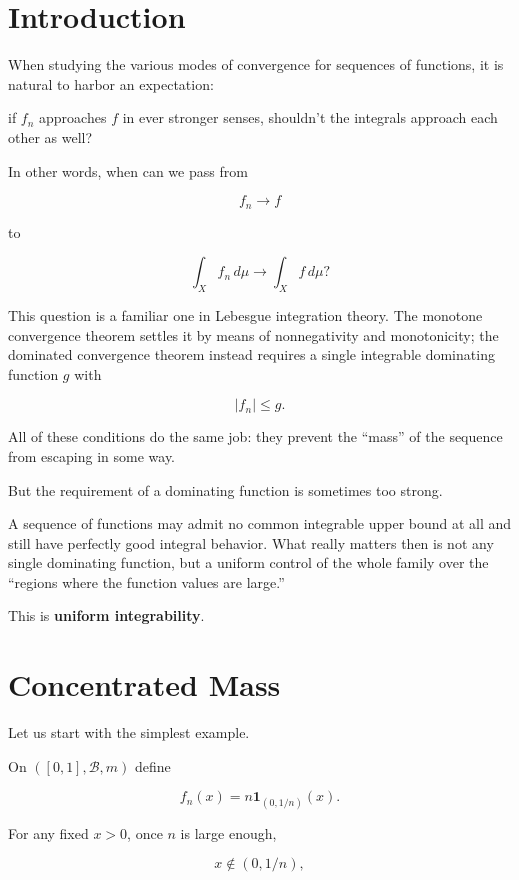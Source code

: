 \documentclass[11pt]{article}
\begin{document}
\maketitle


\section*{Introduction}


When studying the various modes of convergence for sequences of functions, it is natural to harbor an expectation:

if $f_n$ approaches $f$ in ever stronger senses, shouldn't the integrals approach each other as well?

In other words, when can we pass from

\[
f_n\to f
\]

to

\[
\int_X f_n\,d\mu
\longrightarrow
\int_X f\,d\mu?
\]

This question is a familiar one in Lebesgue integration theory. The monotone convergence theorem settles it by means of nonnegativity and monotonicity; the dominated convergence theorem instead requires a single integrable dominating function $g$ with

\[
|f_n|\leq g.
\]

All of these conditions do the same job: they prevent the ``mass'' of the sequence from escaping in some way.

But the requirement of a dominating function is sometimes too strong.

A sequence of functions may admit no common integrable upper bound at all and still have perfectly good integral behavior. What really matters then is not any single dominating function, but a uniform control of the whole family over the ``regions where the function values are large.''

This is \textbf{uniform integrability}.


\section{Concentrated Mass}


Let us start with the simplest example.

On $([0,1],\mathcal B,m)$ define

\[
f_n(x)
=
n\mathbf 1_{(0,1/n)}(x).
\]

For any fixed $x>0$, once $n$ is large enough,

\[
x\notin(0,1/n),
\]
\end{document}
